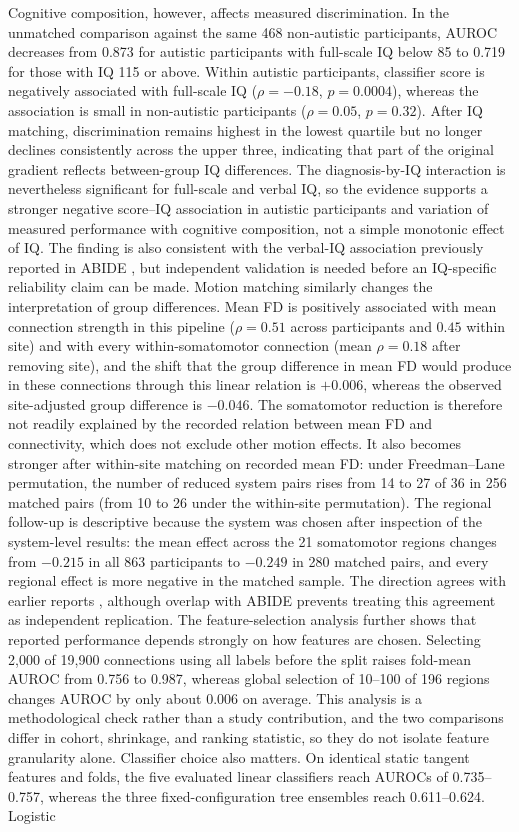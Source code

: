 Cognitive composition, however, affects measured discrimination. In the unmatched comparison against the same 468 non-autistic participants, AUROC decreases from 0.873 for autistic participants with full-scale IQ below 85 to 0.719 for those with IQ 115 or above. Within autistic participants, classifier score is negatively associated with full-scale IQ ($\rho=-0.18$, $p=0.0004$), whereas the association is small in non-autistic participants ($\rho=0.05$, $p=0.32$). After IQ matching, discrimination remains highest in the lowest quartile but no longer declines consistently across the upper three, indicating that part of the original gradient reflects between-group IQ differences. The diagnosis-by-IQ interaction is nevertheless significant for full-scale and verbal IQ, so the evidence supports a stronger negative score--IQ association in autistic participants and variation of measured performance with cognitive composition, not a simple monotonic effect of IQ. The finding is also consistent with the verbal-IQ association previously reported in ABIDE \citep{Nielsenetal2013}, but independent validation is needed before an IQ-specific reliability claim can be made. Motion matching similarly changes the interpretation of group differences. Mean FD is positively associated with mean connection strength in this pipeline ($\rho=0.51$ across participants and $0.45$ within site) and with every within-somatomotor connection (mean $\rho=0.18$ after removing site), and the shift that the group difference in mean FD would produce in these connections through this linear relation is $+0.006$, whereas the observed site-adjusted group difference is $-0.046$. The somatomotor reduction is therefore not readily explained by the recorded relation between mean FD and connectivity, which does not exclude other motion effects. It also becomes stronger after within-site matching on recorded mean FD: under Freedman--Lane permutation, the number of reduced system pairs rises from 14 to 27 of 36 in 256 matched pairs (from 10 to 26 under the within-site permutation). The regional follow-up is descriptive because the system was chosen after inspection of the system-level results: the mean effect across the 21 somatomotor regions changes from $-0.215$ in all 863 participants to $-0.249$ in 280 matched pairs, and every regional effect is more negative in the matched sample. The direction agrees with earlier reports \citep{Chenetal2015,Holigaetal2019,Ilioskaetal2023}, although overlap with ABIDE prevents treating this agreement as independent replication. The feature-selection analysis further shows that reported performance depends strongly on how features are chosen. Selecting 2,000 of 19,900 connections using all labels before the split raises fold-mean AUROC from 0.756 to 0.987, whereas global selection of 10--100 of 196 regions changes AUROC by only about 0.006 on average. This analysis is a methodological check rather than a study contribution, and the two comparisons differ in cohort, shrinkage, and ranking statistic, so they do not isolate feature granularity alone. Classifier choice also matters. On identical static tangent features and folds, the five evaluated linear classifiers reach AUROCs of 0.735--0.757, whereas the three fixed-configuration tree ensembles reach 0.611--0.624. Logistic 